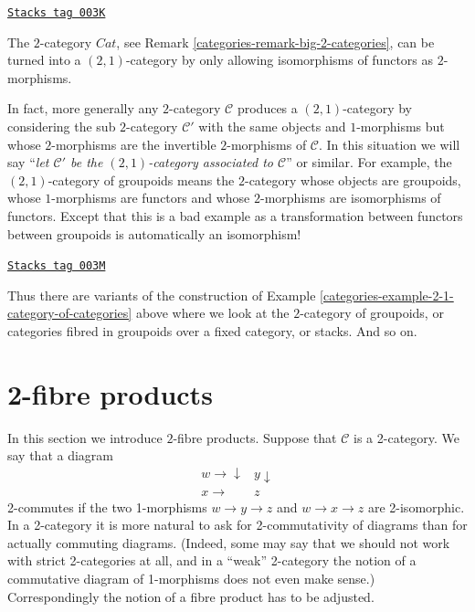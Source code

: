 \begin{example}
\label{categories-example-2-1-category-of-categories}
\href{https://stacks.math.columbia.edu/tag/003K}{\texttt{Stacks tag 003K}}

The $2$-category $\textit{Cat}$, see Remark \ref{categories-remark-big-2-categories},
can be turned into a $(2, 1)$-category by only allowing isomorphisms of
functors as $2$-morphisms.
\end{example}

In fact, more generally any $2$-category
$\mathcal{C}$ produces a $(2, 1)$-category by considering the sub $2$-category
$\mathcal{C}'$ with the same objects and $1$-morphisms but whose
$2$-morphisms are the invertible $2$-morphisms of $\mathcal{C}$.
In this situation we will say ``{\it let $\mathcal{C}'$ be
the $(2, 1)$-category associated to $\mathcal{C}$}'' or similar.
For example, the $(2, 1)$-category of groupoids means the
$2$-category whose objects are groupoids, whose
$1$-morphisms are functors and whose $2$-morphisms are
isomorphisms of functors. Except that this is a bad example as a
transformation between functors between groupoids is automatically
an isomorphism!

\begin{remark}
\label{categories-remark-other-2-categories}
\href{https://stacks.math.columbia.edu/tag/003M}{\texttt{Stacks tag 003M}}

Thus there are variants of the construction of
Example \ref{categories-example-2-1-category-of-categories}
above where we look at the $2$-category of groupoids,
or categories fibred in groupoids over a fixed
category, or stacks. And so on.
\end{remark}

\section{2-fibre products}
\label{categories-section-2-fibre-products}
In this section we introduce $2$-fibre products. Suppose that $\mathcal{C}$
is a 2-category. We say that a diagram
$$
\begin{array}{cc}w \longrightarrow\downarrow & y \downarrow \\ x \longrightarrow & z\end{array}
$$
2-commutes if the two 1-morphisms $w \to y \to z$ and $w \to x \to z$ are
2-isomorphic. In a 2-category it is more natural to ask for 2-commutativity
of diagrams than for actually commuting diagrams. (Indeed, some may say that
we should not work with strict 2-categories at all, and in a ``weak''
2-category the notion of a commutative diagram of 1-morphisms does not even
make sense.) Correspondingly the notion of a fibre product has to be adjusted.

